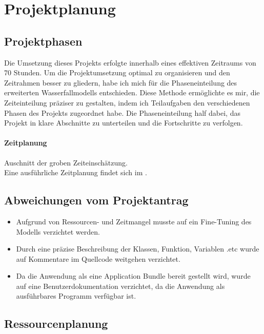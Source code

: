 \section{Projektplanung} 
\label{sec:Projektplanung}

\subsection{Projektphasen}
\label{sec:Projektphasen}

Die Umsetzung dieses Projekts erfolgte innerhalb eines effektiven Zeitraums von 70 Stunden.
Um die Projektumsetzung optimal zu organisieren und den Zeitrahmen besser zu gliedern, 
habe ich mich für die Phaseneinteilung des erweiterten Wasserfallmodells entschieden. 
Diese Methode ermöglichte es mir, die Zeiteinteilung präziser zu gestalten, 
indem ich Teilaufgaben den verschiedenen Phasen des Projekts zugeordnet habe.
Die Phaseneinteilung half dabei, das Projekt in klare Abschnitte zu unterteilen 
und die Fortschritte zu verfolgen. 

\paragraph{Zeitplanung}
Auschnitt der groben Zeiteinschätzung.
\\
Eine ausführliche Zeitplanung findet sich im .


\subsection{Abweichungen vom Projektantrag}
\label{sec:AbweichungenProjektantrag}
\begin{itemize}
	\item Aufgrund von Ressourcen- und Zeitmangel musste auf ein Fine-Tuning des Modells verzichtet werden.
	\item Durch eine präzise Beschreibung der Klassen, Funktion, Variablen .etc wurde auf Kommentare im Quellcode weitgehen verzichtet.
	\item Da die Anwendung als eine Application Bundle bereit gestellt wird, wurde auf eine Benutzerdokumentation verzichtet, da die Anwendung als ausführbares Programm verfügbar ist.
\end{itemize}


\subsection{Ressourcenplanung}
\label{sec:Ressourcenplanung}


